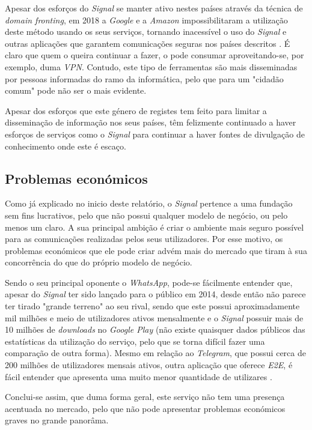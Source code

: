 Apesar dos esforços do \textit{Signal} se manter ativo nestes países através da técnica de \textit{domain fronting}, em 2018 a \textit{Google} e a \textit{Amazon} impossibilitaram a utilização deste método usando os seus serviços, tornando inacessível o uso do \textit{Signal} e outras aplicações que garantem comunicações seguras nos países descritos \cite{signal_amazon_letter}. É claro que quem o queira continuar a fazer, o pode consumar aproveitando-se, por exemplo, duma \textit{VPN}. Contudo, este tipo de ferramentas são mais disseminadas por pessoas informadas do ramo da informática, pelo que para um "cidadão comum" pode não ser o mais evidente.

Apesar dos esforços que este género de registes tem feito para limitar a disseminação de informação nos seus países, têm felizmente continuado a haver esforços de serviços como o \textit{Signal} para continuar a haver fontes de divulgação de conhecimento onde este é escaço.


\subsection{Problemas económicos}
Como já explicado no inicio deste relatório, o \textit{Signal} pertence a uma fundação sem fins lucrativos, pelo que não possui qualquer modelo de negócio, ou pelo menos um claro. A sua principal ambição é criar o ambiente mais seguro possível para as comunicações realizadas pelos seus utilizadores. Por esse motivo, os problemas económicos que ele pode criar advém mais do mercado que tiram à sua concorrência do que do próprio modelo de negócio.

Sendo o seu principal oponente o \textit{WhatsApp}, pode-se fácilmente entender que, apesar do \textit{Signal} ter sido lançado para o público em 2014, desde então não parece ter tirado "grande terreno" ao seu rival, sendo que este possui aproximadamente mil milhões e meio de utilizadores ativos mensalmente e o \textit{Signal} possuir mais de 10 milhões de \textit{downloads} no \textit{Google Play} (não existe quaisquer dados públicos das estatísticas da utilização do serviço, pelo que se torna difícil fazer uma comparação de outra forma). Mesmo em relação ao \textit{Telegram}, que possui cerca de 200 milhões de utilizadores mensais ativos, outra aplicação que oferece \textit{E2E}, é fácil entender que apresenta uma muito menor quantidade de utilizares \cite{other_apps_statistics}. 

Conclui-se assim, que duma forma geral, este serviço não tem uma presença acentuada no mercado, pelo que não pode apresentar problemas económicos graves no grande panorâma.

